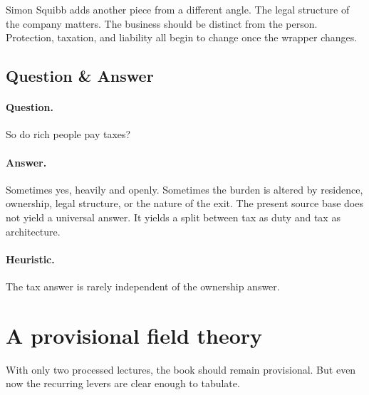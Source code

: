 \documentclass[11pt,oneside]{book}
\begin{document}
Simon Squibb adds another piece from a different angle. The legal structure of the company matters. The business should be distinct from the person. Protection, taxation, and liability all begin to change once the wrapper changes.

\subsection{Question \& Answer}

\paragraph{Question.} So do rich people pay taxes?

\paragraph{Answer.} Sometimes yes, heavily and openly. Sometimes the burden is altered by residence, ownership, legal structure, or the nature of the exit. The present source base does not yield a universal answer. It yields a split between tax as duty and tax as architecture.

\paragraph{Heuristic.} The tax answer is rarely independent of the ownership answer.

\section{A provisional field theory}

With only two processed lectures, the book should remain provisional. But even now the recurring levers are clear enough to tabulate.
\end{document}

